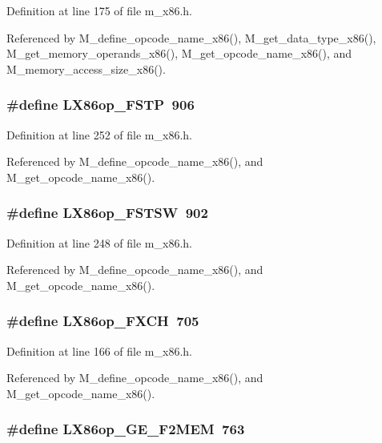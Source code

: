 Definition at line 175 of file m\_\-x86.h.

Referenced by M\_\-define\_\-opcode\_\-name\_\-x86(), M\_\-get\_\-data\_\-type\_\-x86(), M\_\-get\_\-memory\_\-operands\_\-x86(), M\_\-get\_\-opcode\_\-name\_\-x86(), and M\_\-memory\_\-access\_\-size\_\-x86().
\subsubsection{\setlength{\rightskip}{0pt plus 5cm}\#define LX86op\_\-FSTP~906}\label{m__x86_8h_ff4e48fd1c5a1235497e2c57a4c7216b}




Definition at line 252 of file m\_\-x86.h.

Referenced by M\_\-define\_\-opcode\_\-name\_\-x86(), and M\_\-get\_\-opcode\_\-name\_\-x86().
\subsubsection{\setlength{\rightskip}{0pt plus 5cm}\#define LX86op\_\-FSTSW~902}\label{m__x86_8h_dcf3b76de70134e72de49424f503ddb8}




Definition at line 248 of file m\_\-x86.h.

Referenced by M\_\-define\_\-opcode\_\-name\_\-x86(), and M\_\-get\_\-opcode\_\-name\_\-x86().
\subsubsection{\setlength{\rightskip}{0pt plus 5cm}\#define LX86op\_\-FXCH~705}\label{m__x86_8h_0b9465efee898cae23de40bde5741000}




Definition at line 166 of file m\_\-x86.h.

Referenced by M\_\-define\_\-opcode\_\-name\_\-x86(), and M\_\-get\_\-opcode\_\-name\_\-x86().
\subsubsection{\setlength{\rightskip}{0pt plus 5cm}\#define LX86op\_\-GE\_\-F2MEM~763}\label{m__x86_8h_b2de1690403dafe59c64d1a5298089a7}




